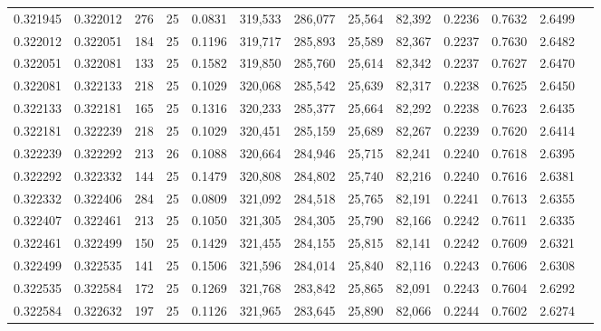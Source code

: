 \begin{tabular}{rrrrrrrrrrrrr}
0.321945 & 0.322012 &   276 &  25 &                                     0.0831 & 319,533 & 286,077 &  25,564 &  82,392 & 0.2236 & 0.7632 & 2.6499 \\
0.322012 & 0.322051 &   184 &  25 &                                     0.1196 & 319,717 & 285,893 &  25,589 &  82,367 & 0.2237 & 0.7630 & 2.6482 \\
0.322051 & 0.322081 &   133 &  25 &                                     0.1582 & 319,850 & 285,760 &  25,614 &  82,342 & 0.2237 & 0.7627 & 2.6470 \\
0.322081 & 0.322133 &   218 &  25 &                                     0.1029 & 320,068 & 285,542 &  25,639 &  82,317 & 0.2238 & 0.7625 & 2.6450 \\
0.322133 & 0.322181 &   165 &  25 &                                     0.1316 & 320,233 & 285,377 &  25,664 &  82,292 & 0.2238 & 0.7623 & 2.6435 \\
0.322181 & 0.322239 &   218 &  25 &                                     0.1029 & 320,451 & 285,159 &  25,689 &  82,267 & 0.2239 & 0.7620 & 2.6414 \\
0.322239 & 0.322292 &   213 &  26 &                                     0.1088 & 320,664 & 284,946 &  25,715 &  82,241 & 0.2240 & 0.7618 & 2.6395 \\
0.322292 & 0.322332 &   144 &  25 &                                     0.1479 & 320,808 & 284,802 &  25,740 &  82,216 & 0.2240 & 0.7616 & 2.6381 \\
0.322332 & 0.322406 &   284 &  25 &                                     0.0809 & 321,092 & 284,518 &  25,765 &  82,191 & 0.2241 & 0.7613 & 2.6355 \\
0.322407 & 0.322461 &   213 &  25 &                                     0.1050 & 321,305 & 284,305 &  25,790 &  82,166 & 0.2242 & 0.7611 & 2.6335 \\
0.322461 & 0.322499 &   150 &  25 &                                     0.1429 & 321,455 & 284,155 &  25,815 &  82,141 & 0.2242 & 0.7609 & 2.6321 \\
0.322499 & 0.322535 &   141 &  25 &                                     0.1506 & 321,596 & 284,014 &  25,840 &  82,116 & 0.2243 & 0.7606 & 2.6308 \\
0.322535 & 0.322584 &   172 &  25 &                                     0.1269 & 321,768 & 283,842 &  25,865 &  82,091 & 0.2243 & 0.7604 & 2.6292 \\
0.322584 & 0.322632 &   197 &  25 &                                     0.1126 & 321,965 & 283,645 &  25,890 &  82,066 & 0.2244 & 0.7602 & 2.6274 \\

\end{tabular}
